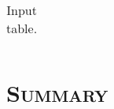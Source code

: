 \documentclass[xcolor=x11names,compress,8pt]{beamer}
\renewcommand{\(}{\begin{columns}}
\renewcommand{\)}{\end{columns}}
\newcommand{\<}[1]{\begin{column}{#1}}
\renewcommand{\>}{\end{column}}
\begin{document}
\begin{table}[h]
\begin{center}
\begin{tabular}{ c  c  c  c  c  c  c }

%
%

    \hline
  	\end{tabular}
  	\caption[Input table.]{Input table.}
  \label{tabPhysicsAsymInput}
\end{center}
\end{table}





\section{\scshape Summary}
\end{document}
